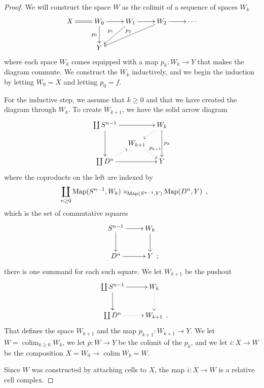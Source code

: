 \documentclass[12pt]{amsart}
\numberwithin{equation}{section}
\theoremstyle{slplain}
\theoremstyle{definition}
\theoremstyle{remark}
\DeclareMathOperator*{\colim}{colim}
\DeclareMathOperator{\Map}{Map}
\newcommand{\CofSquares}{%
  \mappullback{(S^{n-1}, W_{k})}
  {(S^{n-1}, Y)}
  {(D^{n}, Y)}%
}%
\newcommand{\pullback}[3]{#1\mathbin{\mathord{\times}_{\!#2}}#3}
\newcommand{\mappullback}[3]{\pullback{\Map#1}{\Map#2}{\Map#3}}
\newcommand{\Comma}{\rlap{\enspace ,}}
\newcommand{\Period}{\rlap{\enspace .}}
\newcommand{\Semicolon}{\rlap{\enspace ;}}
\begin{document}
\begin{proof}
  We will construct the space $W$ as the colimit of a sequence of
  spaces $W_{k}$
  \begin{displaymath}
    \xymatrix{
      {X} \ar@{=}[r]
      & {W_{0}} \ar[r] \ar[d]_{p_{0}}
      & {W_{1}} \ar[r] \ar[dl]_{p_{1}}
      & {W_{2}} \ar[r] \ar[dll]_{p_{2}}
      & {\cdots}\\
      & {Y}
    }
  \end{displaymath}
  where each space $W_{k}$ comes equipped with a map $p_{k}\colon
  W_{k} \to Y$ that makes the diagram commute.  We construct the
  $W_{k}$ inductively, and we begin the induction by letting $W_{0} =
  X$ and letting $p_{0} = f$.

  For the inductive step, we assume that $k \ge 0$ and that we have
  created the diagram through $W_{k}$.  To create $W_{k+1}$, we have
  the solid arrow diagram
  \begin{displaymath}
    \xymatrix@=1em{
      {\coprod S^{n-1}}
      \ar[rr] \ar[dd]
      && {W_{k}} \ar[dd]^{p_{k}} \ar@{..>}[dl]\\
      & {W_{k+1}} \ar@{..>}[dr]^{p_{k+1}}\\
      {\coprod D^{n}}
      \ar[rr] \ar@{..>}[ur]
      && {Y}
    }
  \end{displaymath}
  where the coproducts on the left are indexed by
  \begin{displaymath}
    \coprod_{n \ge 0} \CofSquares \Comma
  \end{displaymath}
  which is the set of commutative squares
  \begin{displaymath}
    \xymatrix{
      {S^{n-1}} \ar[r] \ar[d]
      & {W_{k}} \ar[d]\\
      {D^{n}} \ar[r]
      & {Y \Semicolon}
    }
  \end{displaymath}
  there is one summand for each such square.  We let $W_{k+1}$ be the
  pushout
  \begin{displaymath}
    \xymatrix{
      {\coprod S^{n-1}} \ar[r] \ar[d]
      & {W_{k}} \ar@{..>}[d]\\
      {\coprod D^{n}} \ar@{..>}[r]
      & {W_{k+1} \Period}
    }
  \end{displaymath}
  That defines the space $W_{k+1}$ and the map $p_{k+1}\colon W_{k+1}
  \to Y$.  We let $W = \colim_{k\ge 0} W_{k}$, we let $p\colon W \to
  Y$ be the colimit of the $p_{k}$, and we let $i\colon X \to W$ be
  the composition $X = W_{0} \to \colim W_{k} = W$.

  Since $W$ was constructed by attaching cells to $X$, the map
  $i\colon X \to W$ is a relative cell complex.


\end{proof}
\end{document}
